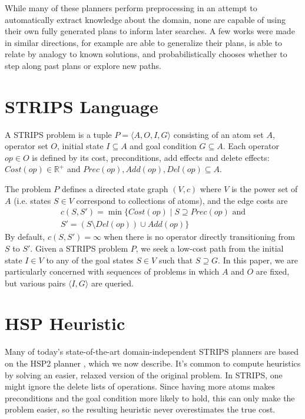 \documentclass[letterpaper]{article}
\begin{document}
While many of these planners perform preprocessing in an attempt to automatically extract knowledge about the domain, none are capable of using their own fully generated plans to inform later searches. A few works were made in similar directions, for example \cite{fikes1972learning} are able to generalize their plans, \cite{veloso1992learning} is able to relate by analogy to known solutions, and \cite{borrajo2012probabilistically} probabilistically chooses whether to step along past plans or explore new paths.

\section{STRIPS Language}

A STRIPS problem is a tuple $P = \langle A,O,I,G\rangle$ consisting of an atom set $A$, operator set $O$, initial state $I \subseteq A$ and goal condition $G \subseteq A$.
Each operator $op\in O$ is defined by its cost, preconditions, add effects and delete effects: $Cost(op) \in \mathbb{R}^+$ and $Prec(op),Add(op),Del(op) \subseteq A$.

The problem $P$ defines a directed state graph $(V,c)$ where $V$ is the power set of $A$ (i.e. states $S\in V$ correspond to collections of atoms), and the edge costs are
\begin{eqnarray*} c(S,S') = \min\{Cost(op) \mid S\supseteq Prec(op)\text{ and}
\\S' = \left(S \setminus Del(op)\right) \cup Add(op)\} \end{eqnarray*}
By default, $c(S,S') = \infty$ when there is no operator directly transitioning from $S$ to $S'$.
Given a STRIPS problem $P$, we seek a low-cost path from the initial state $I\in V$ to any of the goal states $S\in V$ such that $S \supseteq G$. In this paper, we are particularly concerned with sequences of problems in which $A$ and $O$ are fixed, but various pairs $\langle I,G\rangle$ are queried.

\section{HSP Heuristic}

Many of today's state-of-the-art domain-independent STRIPS planners are based on the HSP2 planner \cite{bonet2001planning}, which we now describe.
It's common to compute heuristics by solving an easier, relaxed version of the original problem. In STRIPS, one might ignore the delete lists of operations.
Since having more atoms makes preconditions and the goal condition more likely to hold, this can only make the problem easier, so the resulting heuristic never overestimates the true cost.
\end{document}
